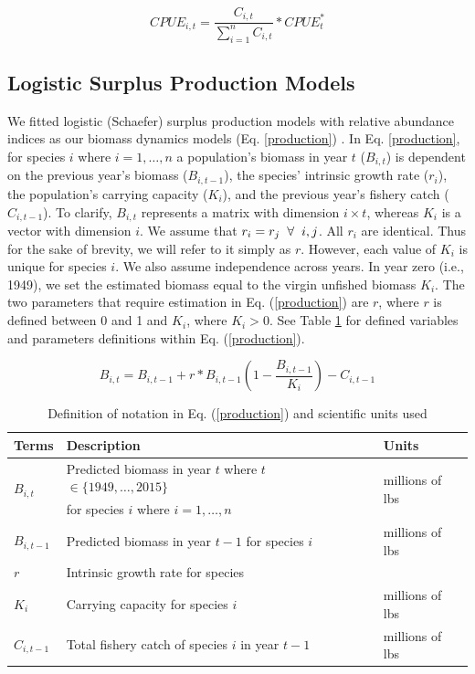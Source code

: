 \documentclass[oneside,12pt,final]{sty/ucthesis-CA2012}
\let\cite\citep                             %
\begin{document}
\begin{mainmatter}
\begin{equation} \label{proportion}
CPUE_{i,t} = \frac{C_{i,t}}{\sum_{i=1}^{n}C_{i,t}}*CPUE_t^*
\end{equation}

\subsection*{Logistic Surplus Production Models}
We fitted logistic (Schaefer) surplus production models with relative abundance indices as our biomass dynamics models (Eq. \ref{production}) \cite{schaefer1954some}. In Eq. \ref{production}, for species $i$ where $i=1,\dots,n$ a population's biomass in year $t$ ($B_{i,t}$) is dependent on the previous year's biomass ($B_{i,t-1}$), the species' intrinsic growth rate ($r_i$), the population's carrying capacity ($K_i$), and the previous year's fishery catch ($C_{i,t-1}$). To clarify, $B_{i,t}$ represents a matrix with dimension $i\times t$, whereas $K_i$ is a vector with dimension $i$. We assume that $r_i=r_j \hspace{2mm} \forall \hspace{2mm} i,j$. All $r_i$ are identical. Thus for the sake of brevity, we will refer to it simply as $r$. However, each value of $K_i$ is unique for species $i$. We also assume independence across years. In year zero (i.e., 1949), we set the estimated biomass equal to the virgin unfished biomass $K_i$. The two parameters that require estimation in Eq. (\ref{production}) are $r$, where $r$ is defined between 0 and 1 and $K_i$, where $K_i > 0$. See Table \ref{production_table} for defined variables and parameters definitions within Eq. (\ref{production}).

\begin{equation} \label{production}
B_{i,t} = B_{i,t-1} + r*B_{i,t-1} \left(1- \frac{B_{i,t-1}}{K_i} \right)-C_{i,t-1} 
\end{equation}

\begin{table}[H]
\centering
\caption{Definition of notation in Eq. (\ref{production}) and scientific units used}
\begin{tabular}{l|l|l}
  \hline \small
 Terms & Description & Units  \\ 
   \hline
   \multirow{2}{*}{$B_{i,t}$} & Predicted biomass in year $t$ where $t$ $\in \{1949,\dots,2015\}$  & \multirow{2}{*}{millions of lbs} \\
     &  for species $i$ where $i=1,\dots,n$  &   \\      
   $B_{i,t-1}$ &  Predicted biomass in year $t-1$ for species $i$ & millions of lbs  \\
   $r$ & Intrinsic growth rate for species & \\
   $K_i$ & Carrying capacity for species $i$ & millions of lbs  \\  
   $C_{i,t-1}$ & Total fishery catch of species $i$ in year $t-1$ & millions of lbs \\
   \hline
\end{tabular} 
\label{production_table}
\end{table}


\end{mainmatter}
\end{document}
